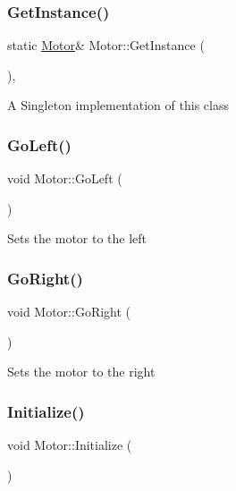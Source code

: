 \subsubsection{\texorpdfstring{Get\+Instance()}{GetInstance()}}
{\footnotesize\ttfamily static \hyperlink{class_motor}{Motor}\& Motor\+::\+Get\+Instance (\begin{DoxyParamCaption}{ }\end{DoxyParamCaption})\hspace{0.3cm}{\ttfamily [inline]}, {\ttfamily [static]}}

A Singleton implementation of this class \hypertarget{class_motor_accc1f6815534eb7e7d694dce8d7be3a9}{}\label{class_motor_accc1f6815534eb7e7d694dce8d7be3a9} 
\subsubsection{\texorpdfstring{Go\+Left()}{GoLeft()}}
{\footnotesize\ttfamily void Motor\+::\+Go\+Left (\begin{DoxyParamCaption}{ }\end{DoxyParamCaption})}

Sets the motor to the left \hypertarget{class_motor_aa7fc3ff7511fb88f3dff67587003ca2d}{}\label{class_motor_aa7fc3ff7511fb88f3dff67587003ca2d} 
\subsubsection{\texorpdfstring{Go\+Right()}{GoRight()}}
{\footnotesize\ttfamily void Motor\+::\+Go\+Right (\begin{DoxyParamCaption}{ }\end{DoxyParamCaption})}

Sets the motor to the right \hypertarget{class_motor_afa5bb4104353e750563252099b6261ca}{}\label{class_motor_afa5bb4104353e750563252099b6261ca} 
\subsubsection{\texorpdfstring{Initialize()}{Initialize()}}
{\footnotesize\ttfamily void Motor\+::\+Initialize (\begin{DoxyParamCaption}{ }\end{DoxyParamCaption})}

